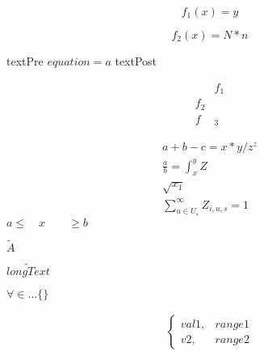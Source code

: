 \documentclass{article}
\begin{document}
    \begin{equation}
        f_1(x) = y
    \end{equation}
    
    \begin{equation*}
        f_2(x) = N*n
    \end{equation*}

    textPre $equation = a$ textPost

    \begin{align*}
        &f_1\\
        f_2&\\
        f&_3
    \end{align*}

    \begin{align}
        a + b - c = x * y / z ^z\\
        \frac{a}{b} = \int_x^y Z\\
        \sqrt{x_1}\\
        \sum_{u \in U_{s}}^{\infty} Z_{i,u,s} = 1
    \end{align}
    $a \leq \quad x \qquad \geq b$

    $\tilde{A}$

    $\widetilde{long Text}$
        
    $\forall \in \dots \{ \}$

    \begin{align}
        \begin{cases}
            val1,  & range1\\
            v2,    & range2
        \end{cases}
    \end{align}
\end{document}
